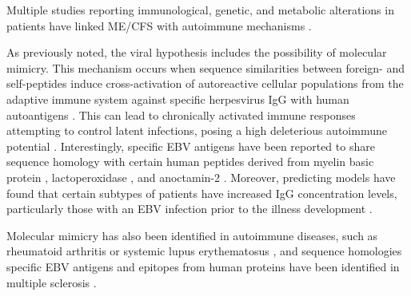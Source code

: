 Multiple studies reporting immunological, genetic, and metabolic alterations in patients have linked ME/CFS with autoimmune mechanisms \citep{sotznyMyalgicEncephalomyelitisChronic2018}.


As previously noted, the viral hypothesis includes the possibility of molecular mimicry.
This mechanism occurs when sequence similarities between foreign- and self-peptides induce cross-activation of autoreactive cellular populations from the adaptive immune system against specific herpesvirus IgG with human autoantigens \citep{fonseca2024IgGAntibody}.
This can lead to chronically activated immune responses attempting to control latent infections, posing a high deleterious autoimmune potential \citep{blomberg2018InfectionEliciteda, sepulveda2019MyalgicEncephalomyelitis, sundaresan2023RoleViral}.
Interestingly, specific EBV antigens have been reported to share sequence homology with certain human peptides derived from myelin basic protein \citep{lunemann2008EBNA1specificCells}, lactoperoxidase \citep{loebel2017SerologicalProfiling}, and anoctamin-2 \citep{tengvall2019MolecularMimicry, sepulveda2021ImpactGenetic}.
Moreover, predicting models have found that certain subtypes of patients have increased IgG concentration levels, particularly those with an EBV infection prior to the illness development \citep{sepulveda2022RevisitingIgG}.

Molecular mimicry has also been identified in autoimmune diseases, such as rheumatoid arthritis or systemic lupus erythematosus \citep{rojas2018MolecularMimicry}, and sequence homologies specific EBV antigens and epitopes from human proteins have been identified in multiple sclerosis \citep{sospedra2005RecognitionConserved, gabibov2011CombinatorialAntibody}.


